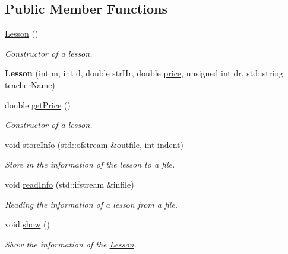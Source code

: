 \subsection*{Public Member Functions}
\begin{DoxyCompactItemize}
\item 
\mbox{\label{class_lesson_a1f6ed0da97171480b7d6d5696d6f2afc}} 
\mbox{\hyperlink{class_lesson_a1f6ed0da97171480b7d6d5696d6f2afc}{Lesson}} ()
\begin{DoxyCompactList}\small\item\em Constructor of a lesson. \end{DoxyCompactList}\item 
\mbox{\label{class_lesson_ad251882cdd4509899ff22cf4a5061e85}} 
{\bfseries Lesson} (int m, int d, double str\+Hr, double \mbox{\hyperlink{class_reservation_a82e197bd30e7949ee9b8616ee4eacf83}{price}}, unsigned int dr, std\+::string teacher\+Name)
\item 
double \mbox{\hyperlink{class_lesson_ad7a2f708f870040627a442cdf000683f}{get\+Price}} ()
\begin{DoxyCompactList}\small\item\em Constructor of a lesson. \end{DoxyCompactList}\item 
void \mbox{\hyperlink{class_lesson_a645855060ab3c915a6e0875bc5584887}{store\+Info}} (std\+::ofstream \&outfile, int \mbox{\hyperlink{class_reservation_a480981ed050bae19bc74bbb0bbb459f9}{indent}})
\begin{DoxyCompactList}\small\item\em Store in the information of the lesson to a file. \end{DoxyCompactList}\item 
void \mbox{\hyperlink{class_lesson_a3ac64e2f79bc9e381634d5d30499e8f1}{read\+Info}} (std\+::ifstream \&infile)
\begin{DoxyCompactList}\small\item\em Reading the information of a lesson from a file. \end{DoxyCompactList}\item 
\mbox{\label{class_lesson_add2dea9a07935a757249e1c0ed0d79e1}} 
void \mbox{\hyperlink{class_lesson_add2dea9a07935a757249e1c0ed0d79e1}{show}} ()
\begin{DoxyCompactList}\small\item\em Show the information of the \mbox{\hyperlink{class_lesson}{Lesson}}. \end{DoxyCompactList}\item 

\end{DoxyCompactItemize}
